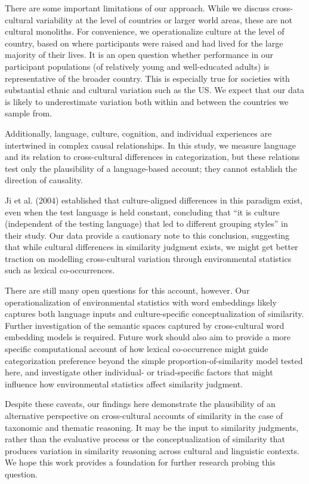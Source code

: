 \documentclass[10pt, letterpaper]{article}
\begin{document}
There are some important limitations of our approach. While we discuss
cross-cultural variability at the level of countries or larger world
areas, these are not cultural monoliths. For convenience, we
operationalize culture at the level of country, based on where
participants were raised and had lived for the large majority of their
lives. It is an open question whether performance in our participant
populations (of relatively young and well-educated adults) is
representative of the broader country. This is especially true for
societies with substantial ethnic and cultural variation such as the US.
We expect that our data is likely to underestimate variation both within
and between the countries we sample from.

Additionally, language, culture, cognition, and individual experiences
are intertwined in complex causal relationships. In this study, we
measure language and its relation to cross-cultural differences in
categorization, but these relations test only the plausibility of a
language-based account; they cannot establish the direction of
causality.

Ji et al. (2004) established that culture-aligned differences in this
paradigm exist, even when the test language is held constant, concluding
that ``it is culture (independent of the testing language) that led to
different grouping styles'' in their study. Our data provide a
cautionary note to this conclusion, suggesting that while cultural
differences in similarity judgment exists, we might get better traction
on modelling cross-cultural variation through environmental statistics
such as lexical co-occurrences.

There are still many open questions for this account, however. Our
operationalization of environmental statistics with word embeddings
likely captures both language inputs and culture-specific
conceptualization of similarity. Further investigation of the semantic
spaces captured by cross-cultural word embedding models is required.
Future work should also aim to provide a more specific computational
account of how lexical co-occurrence might guide categorization
preference beyond the simple proportion-of-similarity model tested here,
and investigate other individual- or triad-specific factors that might
influence how environmental statistics affect similarity judgment.

Despite these caveats, our findings here demonstrate the plausibility of
an alternative perspective on cross-cultural accounts of similarity in
the case of taxonomic and thematic reasoning. It may be the input to
similarity judgments, rather than the evaluative process or the
conceptualization of similarity that produces variation in similarity
reasoning across cultural and linguistic contexts. We hope this work
provides a foundation for further research probing this question.
\end{document}
